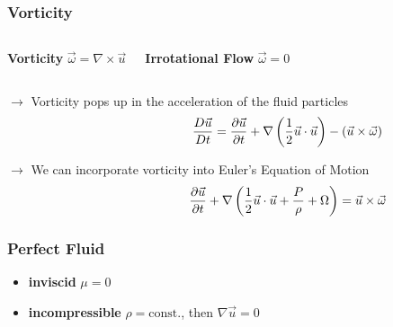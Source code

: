 \documentclass[fleqn]{beamer}
\begin{document}
    \begin{frame}
        \frametitle{Vorticity}
        \begin{columns}
            \begin{block}{\centering\textbf{Vorticity}}
                \centering
                $\vec{\omega} = \nabla \times \vec{u}$
            \end{block}
            \begin{block}{\centering\textbf{Irrotational Flow}}
                \centering
                $\vec{\omega} = 0$
            \end{block}
        \end{columns}
        \vspace{0.5cm}

        \centering $\rightarrow$ Vorticity pops up in the acceleration of
        the fluid particles
        \begin{align}
            \hspace{0.25\linewidth}
            \frac{D\vec{u}}{Dt} = \frac{\partial \vec{u}}{\partial t}+
            \nabla \left( \frac{1}{2} \vec{u} \cdot \vec{u}\right)  - \left(
            \vec{u}\times \vec{\omega}  \right)\nonumber
        \end{align}

        \centering $\rightarrow$ We can incorporate vorticity into Euler's
        Equation of Motion
        \begin{align}
            \hspace{0.25\linewidth}\frac{\partial \vec{u}}{\partial t} + \nabla\left(
            \frac{1}{2}\vec{u}\cdot\vec{u} + \frac{P}{\rho} + \Omega \right)
            = \vec{u} \times \vec{\omega} \nonumber
        \end{align}
    \end{frame}

    \begin{frame}
        \frametitle{Perfect Fluid}
        \begin{itemize}
            \item \textbf{inviscid} $\mu = 0$
            \item \textbf{incompressible} $\rho = \text{const}.$, then
                $\nabla \vec{u} = 0$
        \end{itemize}

    \end{frame}
\end{document}
